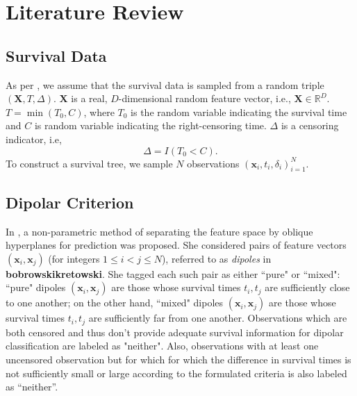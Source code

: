 \documentclass[12pt]{amsart}
\theoremstyle{definition}
\theoremstyle{plain}
\theoremstyle{remark}
\begin{document}
\section{Literature Review} %


\subsection{Survival Data}


As per \cite{kretowska}, we assume that the survival data is sampled from a random triple $(\mathbf{X}, T, \Delta)$. $\mathbf{X}$ is a real, $D$-dimensional random feature vector, i.e., $\mathbf{X} \in \mathbb{R}^D$. $T = \min(T_0, C)$, where $T_0$ is the random variable indicating the survival time and $C$ is random variable indicating the right-censoring time. $\Delta$ is a censoring indicator, i.e, 
\[
\Delta = I(T_0 < C). 
\] 
To construct a survival tree, we sample $N$ observations $(\mathbf{x}_i, t_i, \delta_i)_{i = 1}^N$. 

\subsection{Dipolar Criterion}

In \cite{kretowska}, a non-parametric method of separating the feature space by oblique hyperplanes for prediction was proposed. She considered pairs of feature vectors $(\mathbf{x}_i, \mathbf{x}_j)$ (for integers $1 \leq i < j \leq N$), referred to as \emph{dipoles} in \textbf{bobrowskikretowski}. She tagged each such pair as either ``pure" or ``mixed": ``pure" dipoles $(\mathbf{x}_i, \mathbf{x}_j)$ are those whose survival times $t_i, t_j$ are sufficiently close to one another; on the other hand, ``mixed" dipoles $(\mathbf{x}_i, \mathbf{x}_j)$ are those whose survival times $t_i, t_j$ are sufficiently far from one another.  Observations which are both censored and thus don't provide adequate survival information for dipolar classification are labeled as "neither". Also, observations with at least one uncensored observation but for which for which the difference in survival times is not sufficiently small or large according to the formulated criteria is also labeled as ``neither''. \\
\end{document}
